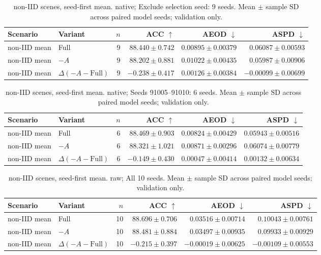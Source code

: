 \begin{table}[t]
\centering
\small
\caption{non-IID scenes, seed-first mean. native; Exclude selection seed: 9 seeds. Mean $\pm$ sample SD across paired model seeds; validation only.}
\begin{tabular}{llrrrr}
\toprule
Scenario & Variant & $n$ & ACC $\uparrow$ & AEOD $\downarrow$ & ASPD $\downarrow$ \\
\midrule
non-IID mean & Full & 9 & $88.440 \pm 0.742$ & $0.00895 \pm 0.00379$ & $0.06087 \pm 0.00593$ \\
non-IID mean & $-A$ & 9 & $88.202 \pm 0.881$ & $0.01022 \pm 0.00435$ & $0.05987 \pm 0.00906$ \\
non-IID mean & $\Delta(-A-\mathrm{Full})$ & 9 & $-0.238 \pm 0.417$ & $0.00126 \pm 0.00384$ & $-0.00099 \pm 0.00699$ \\
\bottomrule
\end{tabular}
\end{table}

\begin{table}[t]
\centering
\small
\caption{non-IID scenes, seed-first mean. native; Seeds 91005–91010: 6 seeds. Mean $\pm$ sample SD across paired model seeds; validation only.}
\begin{tabular}{llrrrr}
\toprule
Scenario & Variant & $n$ & ACC $\uparrow$ & AEOD $\downarrow$ & ASPD $\downarrow$ \\
\midrule
non-IID mean & Full & 6 & $88.469 \pm 0.903$ & $0.00824 \pm 0.00429$ & $0.05943 \pm 0.00516$ \\
non-IID mean & $-A$ & 6 & $88.321 \pm 1.021$ & $0.00871 \pm 0.00296$ & $0.06074 \pm 0.00779$ \\
non-IID mean & $\Delta(-A-\mathrm{Full})$ & 6 & $-0.149 \pm 0.430$ & $0.00047 \pm 0.00414$ & $0.00132 \pm 0.00634$ \\
\bottomrule
\end{tabular}
\end{table}

\begin{table}[t]
\centering
\small
\caption{non-IID scenes, seed-first mean. raw; All 10 seeds. Mean $\pm$ sample SD across paired model seeds; validation only.}
\begin{tabular}{llrrrr}
\toprule
Scenario & Variant & $n$ & ACC $\uparrow$ & AEOD $\downarrow$ & ASPD $\downarrow$ \\
\midrule
non-IID mean & Full & 10 & $88.696 \pm 0.706$ & $0.03516 \pm 0.00714$ & $0.10043 \pm 0.00761$ \\
non-IID mean & $-A$ & 10 & $88.481 \pm 0.884$ & $0.03497 \pm 0.00935$ & $0.09933 \pm 0.00929$ \\
non-IID mean & $\Delta(-A-\mathrm{Full})$ & 10 & $-0.215 \pm 0.397$ & $-0.00019 \pm 0.00625$ & $-0.00109 \pm 0.00553$ \\
\bottomrule
\end{tabular}
\end{table}

